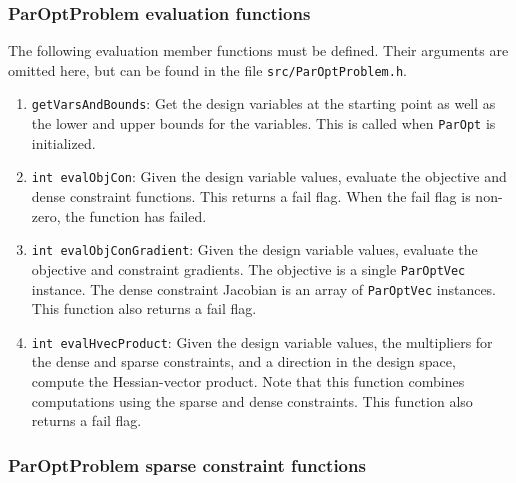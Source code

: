 \documentclass[12pt]{article}
\begin{document}
\subsubsection{ParOptProblem evaluation functions}

The following evaluation member functions must be defined. Their arguments are omitted here, but can be found
in the file \texttt{src/ParOptProblem.h}.
\begin{enumerate}
\item \texttt{getVarsAndBounds}: Get the design variables at the starting point as well as the lower and upper bounds for the variables. This is called when \texttt{ParOpt} is initialized. 

\item \texttt{int evalObjCon}: Given the design variable values, evaluate the objective and dense constraint functions. This returns a fail flag. When the fail flag is non-zero, the function has failed.

\item \texttt{int evalObjConGradient}: Given the design variable values, evaluate the objective and constraint gradients. The objective is a single \texttt{ParOptVec} instance. The dense constraint Jacobian is an array of \texttt{ParOptVec} instances. This function also returns a fail flag. 

\item \texttt{int evalHvecProduct}: Given the design variable values, the multipliers for the dense and sparse constraints, and a direction in the design space, compute the Hessian-vector product. Note that this function combines computations using the sparse and dense constraints. This function also returns a fail flag.
\end{enumerate}

\subsubsection{ParOptProblem sparse constraint functions}
\end{document}
